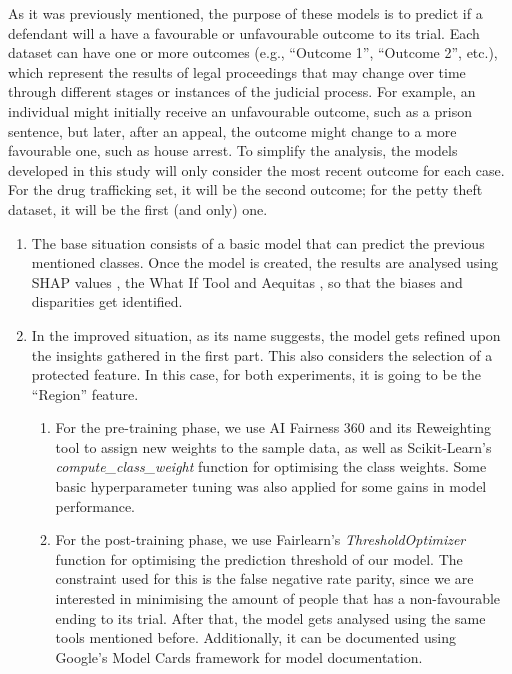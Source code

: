 \documentclass[fleqn,10pt]{wlscirep}
\begin{document}
As it was previously mentioned, the purpose of these models is to predict if a defendant will a have a favourable or unfavourable outcome to its trial. Each dataset can have one or more outcomes (e.g., ``Outcome 1'', ``Outcome 2'', etc.), which represent the results of legal proceedings that may change over time through different stages or instances of the judicial process. For example, an individual might initially receive an unfavourable outcome, such as a prison sentence, but later, after an appeal, the outcome might change to a more favourable one, such as house arrest. To simplify the analysis, the models developed in this study will only consider the most recent outcome for each case. For the drug trafficking set, it will be the second outcome; for the petty theft dataset, it will be the first (and only) one.

\begin{enumerate}
    \item The base situation consists of a basic model that can predict the previous mentioned classes. Once the model is created, the results are analysed using SHAP values \cite{NIPS2017_7062}, the What If Tool \cite{wexler_2018} and Aequitas \cite{DBLP:journals/corr/abs-1811-05577}, so that the biases and disparities get identified.

    \item In the improved situation, as its name suggests, the model gets refined upon the insights gathered in the first part. This also considers the selection of a protected feature. In this case, for both experiments, it is going to be the ``Region'' feature.

    \begin{enumerate}
        \item For the pre-training phase, we use AI Fairness 360 \cite{aif360-oct-2018} and its Reweighting tool to assign new weights to the sample data, as well as Scikit-Learn's \cite{scikit-learn} \textit{compute\_class\_weight} function for optimising the class weights. Some basic hyperparameter tuning was also applied for some gains in model performance.

        \item For the post-training phase, we use Fairlearn's \textit{ThresholdOptimizer} function \cite{Bird2020FairlearnAT} for optimising the prediction threshold of our model. The constraint used for this is the false negative rate parity, since we are interested in minimising the amount of people that has a non-favourable ending to its trial. After that, the model gets analysed using the same tools mentioned before. Additionally, it can be documented using Google's Model Cards framework for model documentation.
    \end{enumerate}
\end{enumerate}
\end{document}
